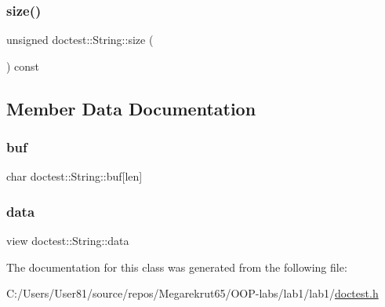 \mbox{\label{classdoctest_1_1_string_a9fbc7b09f1660b236f12fc2adce6183d}} 
\subsubsection{\texorpdfstring{size()}{size()}}
{\footnotesize\ttfamily unsigned doctest\+::\+String\+::size (\begin{DoxyParamCaption}{ }\end{DoxyParamCaption}) const}



\subsection{Member Data Documentation}
\mbox{\label{classdoctest_1_1_string_a7e031ced488588936a540eba26facf67}} 
\subsubsection{\texorpdfstring{buf}{buf}}
{\footnotesize\ttfamily char doctest\+::\+String\+::buf\mbox{[}len\mbox{]}}

\mbox{\label{classdoctest_1_1_string_a5c77ed634a1b81aea739a73fb01d986a}} 
\subsubsection{\texorpdfstring{data}{data}}
{\footnotesize\ttfamily view doctest\+::\+String\+::data}



The documentation for this class was generated from the following file\+:\begin{DoxyCompactItemize}
\item 
C\+:/\+Users/\+User81/source/repos/\+Megarekrut65/\+O\+O\+P-\/labs/lab1/lab1/\mbox{\hyperlink{doctest_8h}{doctest.\+h}}\end{DoxyCompactItemize}
